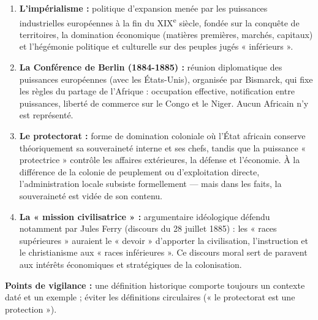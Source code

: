 \documentclass[11pt]{article}
\begin{document}
\begin{corrige}
\begin{enumerate}
    \item \textbf{L'impérialisme :} politique d'expansion menée par les puissances industrielles européennes à la fin du XIX\textsuperscript{e} siècle, fondée sur la conquête de territoires, la domination économique (matières premières, marchés, capitaux) et l'hégémonie politique et culturelle sur des peuples jugés « inférieurs ».
    \item \textbf{La Conférence de Berlin (1884-1885) :} réunion diplomatique des puissances européennes (avec les États-Unis), organisée par Bismarck, qui fixe les règles du partage de l'Afrique : occupation effective, notification entre puissances, liberté de commerce sur le Congo et le Niger. Aucun Africain n'y est représenté.
    \item \textbf{Le protectorat :} forme de domination coloniale où l'État africain conserve théoriquement sa souveraineté interne et ses chefs, tandis que la puissance « protectrice » contrôle les affaires extérieures, la défense et l'économie. À la différence de la colonie de peuplement ou d'exploitation directe, l'administration locale subsiste formellement — mais dans les faits, la souveraineté est vidée de son contenu.
    \item \textbf{La « mission civilisatrice » :} argumentaire idéologique défendu notamment par Jules Ferry (discours du 28 juillet 1885) : les « races supérieures » auraient le « devoir » d'apporter la civilisation, l'instruction et le christianisme aux « races inférieures ». Ce discours moral sert de paravent aux intérêts économiques et stratégiques de la colonisation.
\end{enumerate}
\textbf{Points de vigilance :} une définition historique comporte toujours un contexte daté et un exemple ; éviter les définitions circulaires (« le protectorat est une protection »).
\end{corrige}
\end{document}
